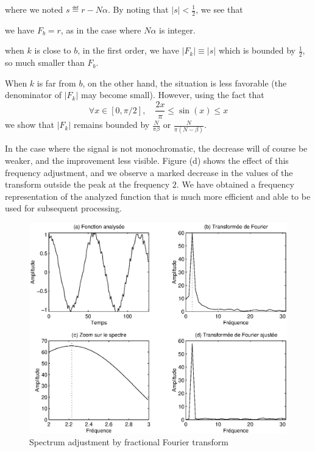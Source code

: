 where we noted $ s \eqdef r - N \alpha $. By noting that $ | s | <\frac{1}{2} $, we see that \begin{rs}
\item we have $ F_b = r $, as in the case where $ N \alpha $ is integer.
\item when $ k $ is close to $ b $, in the first order, we have $ | F_k | \equiv | s | $ which is bounded by $ \frac{1}{2} $, so much smaller than $ F_b $.
\item When $ k $ is far from $ b $, on the other hand, the situation is less favorable (the denominator of $ | F_k | $ may become small). However, using the fact that
\begin{equation*}
\forall x \in [0, \pi / 2], \quad \frac{2 x}{\pi} \leq \sin (x) \leq x
\end{equation*}
we show that $ | F_k | $ remains bounded by $ \frac{N}{\pi \beta} $ or $ \frac{N}{\pi (N- \beta)} $.
\end{rs} In the case where the signal is not monochromatic, the decrease will of course be weaker, and the improvement less visible. Figure  (d) shows the effect of this frequency adjustment, and we observe a marked decrease in the values of the transform outside the peak at the frequency $ 2 $. We have obtained a frequency representation of the analyzed function that is much more efficient and able to be used for subsequent processing. \begin{figure}[ht]
    \begin{center}
    \includegraphics[scale=0.6]{images/transformee-fourier-fractionnaire.eps}
    \end{center}
    \caption{Spectrum adjustment by fractional Fourier transform}
              \label{fig-transforme-fourier-fractionionnaire}
\end{figure}
 
